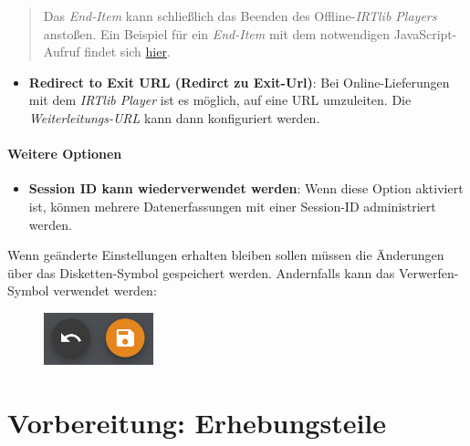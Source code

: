 \documentclass[
  letterpaper,
  DIV=11]{scrreprt}
\providecommand{\tightlist}{%
  \setlength{\itemsep}{0pt}\setlength{\parskip}{0pt}}\usepackage{longtable,booktabs,array}
\begin{document}
\begin{tcolorbox}
\begin{quote}
Das \emph{End-Item} kann schließlich das Beenden des
Offline-\emph{IRTlib Players} anstoßen. Ein Beispiel für ein
\emph{End-Item} mit dem notwendigen JavaScript-Aufruf findet sich
\href{https://kroehne.github.io/CBAItemBuilderBook/items/9_09/IRTLibEndItemExample.zip}{hier}.
\end{quote}

\begin{itemize}
\tightlist
\item
  \textbf{Redirect to Exit URL (Redirct zu Exit-Url)}: Bei
  Online-Lieferungen mit dem \emph{IRTlib Player} ist es möglich, auf
  eine URL umzuleiten. Die \emph{Weiterleitungs-URL} kann dann
  konfiguriert werden.
\end{itemize}

\hypertarget{weitere-optionen-1}{%
\subsubsection{Weitere Optionen}\label{weitere-optionen-1}}

\begin{itemize}
\tightlist
\item
  \textbf{Session ID kann wiederverwendet werden}: Wenn diese Option
  aktiviert ist, können mehrere Datenerfassungen mit einer Session-ID
  administriert werden.
\end{itemize}

Wenn geänderte Einstellungen erhalten bleiben sollen müssen die
Änderungen über das Disketten-Symbol gespeichert werden. Andernfalls
kann das Verwerfen-Symbol verwendet werden:

\begin{figure}[H]

\includegraphics[width=1.25in,height=\textheight]{img/screenshot-icons-undo-and-save-01.png} \hfill{}

\end{figure}

\end{tcolorbox}


\hypertarget{vorbereitung-erhebungsteile}{%
\chapter{Vorbereitung:
Erhebungsteile}\label{vorbereitung-erhebungsteile}}
\end{document}
